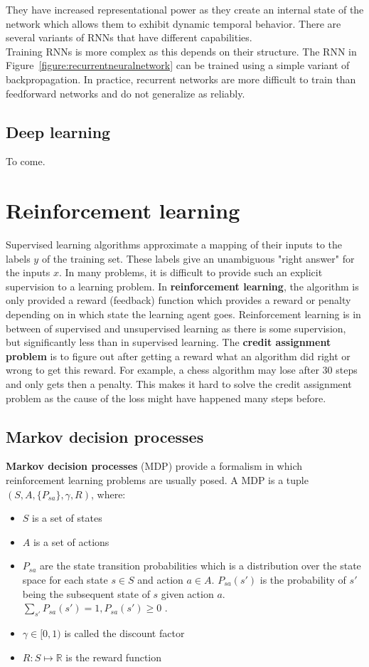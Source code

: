 \documentclass{report}
\begin{document}
They have increased representational power as they create an internal state of the network which allows them to exhibit dynamic temporal behavior. There are several variants of RNNs that have different capabilities.
\\
Training RNNs is more complex as this depends on their structure. The RNN in Figure~\ref{figure:recurrentneuralnetwork} can be trained using a simple variant of backpropagation.
In practice, recurrent networks are more difficult to train than feedforward networks and do not generalize as reliably.


\section{Deep learning}
To come.


\chapter{Reinforcement learning}
\label{chapter:reinforcementlearning}

Supervised learning algorithms approximate a mapping of their inputs to the labels $y$ of the training set.
These labels give an unambiguous "right answer" for the inputs $x$. In many problems, it is difficult to provide such an explicit supervision to a learning problem.
In {\bf reinforcement learning}, the algorithm is only provided a reward (feedback) function which provides a reward or penalty depending on in which state the learning agent goes.
Reinforcement learning is in between of supervised and unsupervised learning as there is some supervision, but significantly less than in supervised learning.
The {\bf credit assignment problem} is to figure out after getting a reward what an algorithm did right or wrong to get this reward.
For example, a chess algorithm may lose after 30 steps and only gets then a penalty.
This makes it hard to solve the credit assignment problem as the cause of the loss might have happened many steps before.

\section{Markov decision processes}
{\bf Markov decision processes} (MDP) provide a formalism in which reinforcement learning problems are usually posed. A MDP is a tuple $(S,A,\{P_{sa}\},\gamma, R)$, where:
\begin{itemize}
\item $S$ is a set of states
\item $A$ is a set of actions
\item $P_{sa}$ are the state transition probabilities which is a distribution over the state space for each state $s\in S$ and action $a\in A$. $P_{sa}(s')$ is the probability of $s'$ being the subsequent state of $s$ given action $a$. $\sum_{s'}P_{sa}(s')=1, P_{sa}(s')\ge 0$ .
\item $\gamma \in [0,1)$ is called the discount factor
\item $R:S \mapsto \mathbb{R}$ is the reward function
\end{itemize}
\end{document}
